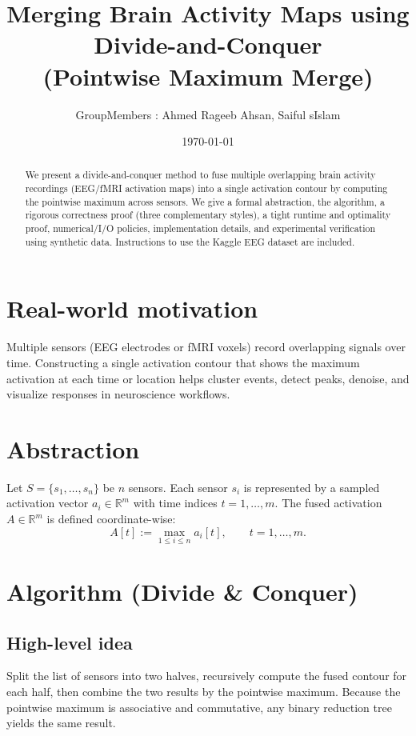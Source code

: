 \documentclass[11pt]{article}
\title{Merging Brain Activity Maps using Divide-and-Conquer\\(Pointwise Maximum Merge)}
\author{GroupMembers : Ahmed Rageeb Ahsan, Saiful sIslam}
\date{\today}
\begin{document}
\maketitle

\begin{abstract}
We present a divide-and-conquer method to fuse multiple overlapping brain activity recordings (EEG/fMRI activation maps) into a single activation contour by computing the pointwise maximum across sensors. We give a formal abstraction, the algorithm, a rigorous correctness proof (three complementary styles), a tight runtime and optimality proof, numerical/I/O policies, implementation details, and experimental verification using synthetic data. Instructions to use the Kaggle EEG dataset are included.
\end{abstract}

\section{Real-world motivation}
Multiple sensors (EEG electrodes or fMRI voxels) record overlapping signals over time. Constructing a single activation contour that shows the maximum activation at each time or location helps cluster events, detect peaks, denoise, and visualize responses in neuroscience workflows.

\section{Abstraction}
Let \(S=\{s_1,\dots,s_n\}\) be \(n\) sensors. Each sensor \(s_i\) is represented by a sampled activation vector \(a_i\in\mathbb{R}^m\) with time indices \(t=1,\dots,m\). The fused activation \(A\in\mathbb{R}^m\) is defined coordinate-wise:
\[
A[t] := \max_{1\le i\le n} a_i[t],\qquad t=1,\dots,m.
\]

\section{Algorithm (Divide \& Conquer)}
\subsection{High-level idea}
Split the list of sensors into two halves, recursively compute the fused contour for each half, then combine the two results by the pointwise maximum. Because the pointwise maximum is associative and commutative, any binary reduction tree yields the same result.
\end{document}
